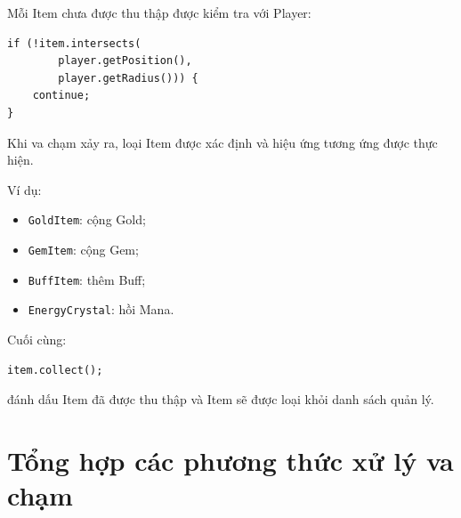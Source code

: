 \documentclass[12pt,a4paper]{report}
\begin{document}
    Mỗi Item chưa được thu thập được kiểm tra với Player:

    \begin{verbatim}
if (!item.intersects(
        player.getPosition(),
        player.getRadius())) {
    continue;
}
    \end{verbatim}

    Khi va chạm xảy ra, loại Item được xác định và hiệu ứng tương ứng
    được thực hiện.

    Ví dụ:

    \begin{itemize}
        \item \texttt{GoldItem}: cộng Gold;
        \item \texttt{GemItem}: cộng Gem;
        \item \texttt{BuffItem}: thêm Buff;
        \item \texttt{EnergyCrystal}: hồi Mana.
    \end{itemize}

    Cuối cùng:

    \begin{verbatim}
item.collect();
    \end{verbatim}

    đánh dấu Item đã được thu thập và Item sẽ được loại khỏi danh sách
    quản lý.




    \section{Tổng hợp các phương thức xử lý va chạm}
\end{document}
